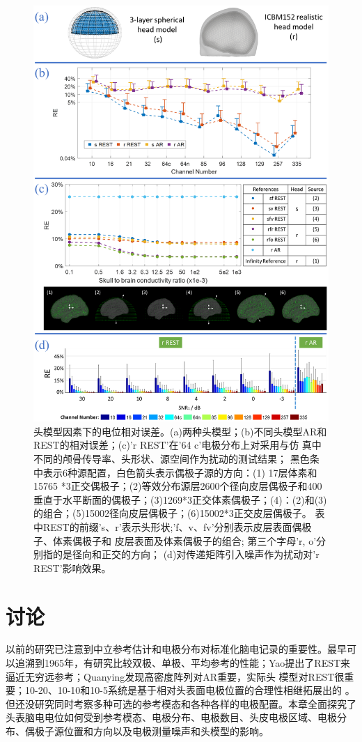 \begin{figure}[!ht]
	\centering
	\includegraphics[width=12cm]{pic/JNE/figure9.png}
	\caption{头模型因素下的电位相对误差。(a)两种头模型；(b)不同头模型AR和REST的相对误差；(c)'r REST'在'64 c'电极分布上对采用与仿
	真中不同的颅骨传导率、头形状、源空间作为扰动的测试结果； 黑色条中表示6种源配置，白色箭头表示偶极子源的方向：(1) 17层体素和15765
	*3正交偶极子；(2)等效分布源层2600个径向皮层偶极子和400垂直于水平断面的偶极子；(3)1269*3正交体素偶极子；(4)：(2)和(3)的组合；(5)15002径向皮层偶极子；(6)15002*3正交皮层偶极子。 表中REST的前缀's、r'表示头形状;'f、v、fv'分别表示皮层表面偶极子、体素偶极子和
	皮层表面及体素偶极子的组合; 第三个字母'r, o'分别指的是径向和正交的方向； (d)对传递矩阵引入噪声作为扰动对'r REST'影响效果。}
	\label{2.9}
\end{figure}

\section{讨论}
以前的研究已注意到中立参考估计和电极分布对标准化脑电记录的重要性。最早可以追溯到1965年，有研究比较双极、单极、平均参考的性能；Yao提出了REST来逼近无穷远参考；Quanying发现高密度阵列对AR重要，实际头
模型对REST很重要；10-20、10-10和10-5系统是基于相对头表面电极位置的合理性相继拓展出的
。但还没研究同时考察多种可选的参考模态和各种各样的电极配置。本章全面探究了头表脑电电位如何受到参考模态、电极分布、电极数目、头皮电极区域、电极分布、偶极子源位置和方向以及电极测量噪声和头模型的影响。

